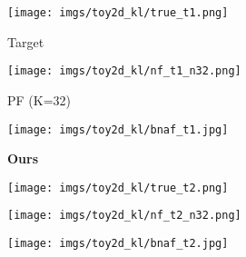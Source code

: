 \documentclass[letterpaper]{article}
\newcommand{\fw}{0.23\linewidth}
\begin{document}
\begin{figure}[t]
 \centering

 \begin{subfigure}[b]{3mm}
 \vspace{2em}
 \end{subfigure}\begin{subfigure}[b]{\fw}
 \centering
 \caption*{Target}
 \vspace{-2mm}
 \texttt{[image: imgs/toy2d\_kl/true\_t1.png]}
 \end{subfigure}\hspace{1mm}\begin{subfigure}[b]{\fw}
 \centering
 \caption*{PF (K=32)}
 \vspace{-2mm}
 \texttt{[image: imgs/toy2d\_kl/nf\_t1\_n32.png]}
 \end{subfigure}\hspace{1mm}\begin{subfigure}[b]{\fw}
 \centering
 \caption*{\textbf{Ours}}
 \vspace{-2mm}
 \texttt{[image: imgs/toy2d\_kl/bnaf\_t1.jpg]}
 \end{subfigure}

 \vspace{1em}
 \begin{subfigure}[b]{3mm}
 \vspace{2em}
 \end{subfigure}\begin{subfigure}[b]{\fw}
 \centering
 \vspace{-2mm}
 \texttt{[image: imgs/toy2d\_kl/true\_t2.png]}
 \end{subfigure}\hspace{1mm}\begin{subfigure}[b]{\fw}
 \centering
 \vspace{-2mm}
 \texttt{[image: imgs/toy2d\_kl/nf\_t2\_n32.png]}
 \end{subfigure}\hspace{1mm}\begin{subfigure}[b]{\fw}
 \centering
 \vspace{-2mm}
 \texttt{[image: imgs/toy2d\_kl/bnaf\_t2.jpg]}
 \end{subfigure}


\end{figure}
\end{document}
